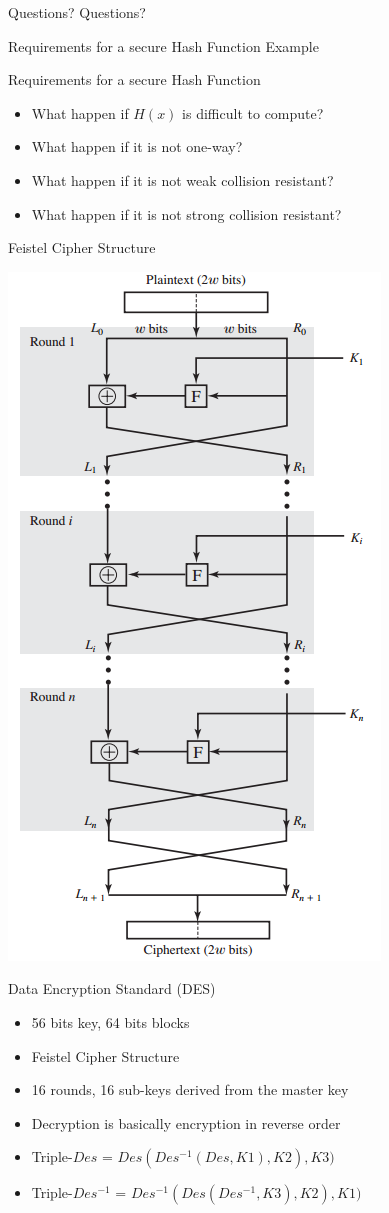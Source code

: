 \documentclass{beamer}
\begin{document}
\begin{frame}{Questions?}
  Questions?
\end{frame}

\begin{frame}{Requirements for a secure Hash Function}
  Example
\end{frame}

\begin{frame}{Requirements for a secure Hash Function}
  \begin{itemize}
  \item<1-> What happen if $H(x)$ is difficult to compute?
  \item<2-> What happen if it is not one-way?
  \item<3-> What happen if it is not weak collision resistant?
  \item<4> What happen if it is not strong  collision resistant?
  \end{itemize}
\end{frame}

\begin{frame}{Feistel Cipher Structure}
  \begin{center}
    \includegraphics[width=0.35\linewidth]{Feistel}
  \end{center}
\end{frame}

\begin{frame}{Data Encryption Standard (DES)}
  \begin{itemize}
  \item 56 bits key, 64 bits blocks 
  \item Feistel Cipher Structure
  \item 16 rounds, 16 sub-keys derived from the master key
  \item Decryption is basically encryption in reverse order
  \item Triple-$Des$ = $Des(Des^{-1}(Des, K1), K2), K3)$
  \item Triple-$Des^{-1}$ = $Des^{-1}(Des(Des^{-1}, K3), K2), K1)$
  \end{itemize}
\end{frame}
\end{document}
